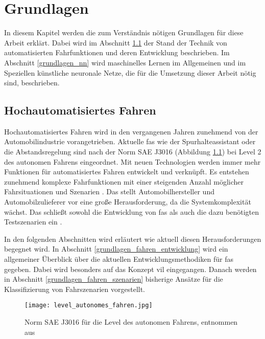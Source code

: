 
\chapter{Grundlagen}
\label{grundlagen}

In diesem Kapitel werden die zum Verständnis nötigen Grundlagen für diese Arbeit erklärt. Dabei wird im Abschnitt \ref{grundlagen_fahren} der Stand der Technik von automatisierten Fahrfunktionen und deren Entwicklung beschrieben. Im Abschnitt \ref{grundlagen_nn} wird maschinelles Lernen im Allgemeinen und im Speziellen künstliche neuronale Netze, die für die Umsetzung dieser Arbeit nötig sind, beschrieben.


\section{Hochautomatisiertes Fahren}
\label{grundlagen_fahren}

Hochautomatisiertes Fahren wird in den vergangenen Jahren zunehmend von der Automobilindustrie vorangetrieben. Aktuelle \gls{fas} wie der Spurhalteassistant oder die Abstandsregelung sind nach der Norm SAE J3016 (Abbildung \ref{fig_level_autonomes_fahren}) bei Level 2 des autonomen Fahrens eingeordnet. Mit neuen Technologien werden immer mehr Funktionen für automatisiertes Fahren entwickelt und verknüpft. Es entstehen zunehmend komplexe Fahrfunktionen mit einer steigenden Anzahl möglicher Fahrsituationen und Szenarien \cite{king2017identification}. Das stellt Automobilhersteller und Automobilzulieferer vor eine große Herausforderung, da die Systemkomplexität wächst. Das schließt sowohl die Entwicklung von \gls{fas} als auch die dazu benötigten Testszenarien ein \cite{pfeffer2016continuous}.

In den folgenden Abschnitten wird erläutert wie aktuell diesen Herausforderungen begegnet wird. In Abschnitt \ref{grundlagen_fahren_entwicklung} wird ein allgemeiner Überblick über die aktuellen Entwicklungsmethodiken für \gls{fas} gegeben. Dabei wird besonders auf das Konzept \gls{vil} eingegangen. Danach werden in Abschnitt \ref{grundlagen_fahren_szenarien} bisherige Ansätze für die Klassifizierung von Fahrszenarien vorgestellt.

\begin{figure}[h]
\centering
\texttt{[image: level\_autonomes\_fahren.jpg]}
\caption{Norm SAE J3016 für die Level des autonomen Fahrens, entnommen aus \cite{sae2014taxonomy}}
\label{fig_level_autonomes_fahren}
\end{figure}


